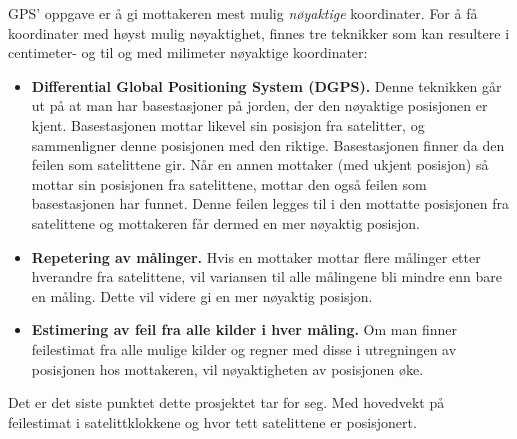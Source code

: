 GPS' oppgave er å gi mottakeren mest mulig \textit{nøyaktige} koordinater. For å få koordinater med høyst mulig nøyaktighet, finnes tre teknikker som kan resultere i centimeter- og til og med milimeter nøyaktige koordinater: \cite{StrangBorre}
\begin{itemize}
  \item \textbf{Differential Global Positioning System (DGPS).} Denne teknikken går ut på at man har basestasjoner på jorden, der  den nøyaktige posisjonen er kjent. Basestasjonen mottar likevel sin posisjon fra satelitter, og sammenligner denne posisjonen med den riktige. Basestasjonen finner da den feilen som satelittene gir. Når en annen mottaker (med ukjent posisjon) så mottar sin posisjonen fra satelittene, mottar den også feilen som basestasjonen har funnet. Denne feilen legges til i den mottatte posisjonen fra satelittene og mottakeren får dermed en mer nøyaktig posisjon. \cite{DGPS}
  \item \textbf{Repetering av målinger.} Hvis en mottaker mottar flere målinger etter hverandre fra satelittene, vil variansen til alle målingene bli mindre enn bare en måling. Dette vil videre gi en mer nøyaktig posisjon. 
  \item \textbf{Estimering av feil fra alle kilder i hver måling.}  Om man finner feilestimat fra alle mulige kilder og regner med disse i utregningen av posisjonen hos mottakeren, vil nøyaktigheten av posisjonen øke. 
\end{itemize}
Det er det siste punktet dette prosjektet tar for seg. Med hovedvekt på feilestimat i satelittklokkene og hvor tett satelittene er posisjonert. 




	
